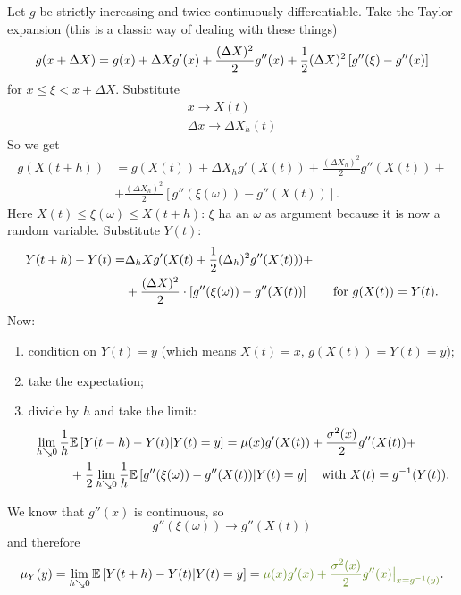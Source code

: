 \documentclass[12pt]{report}
\begin{document}
\begin{fancyproof}
	Let $g$ be strictly increasing and twice continuously differentiable. Take the Taylor expansion (this is a classic way of dealing with these things)
	\begin{equation*}
		g(x+\Delta X)=g(x)+\Delta Xg'(x)+\frac{(\Delta X)^{2}}{2}g''(x)+\frac{1}{2}(\Delta X)^{2}\left[g''(\xi)-g''(x)\right]
	\end{equation*}
	for $x\leq\xi<x+\Delta X$. Substitute 
	\begin{equation*}
		\begin{array}{c}
			x\to X(t)\\
			\Delta  x\to\Delta X_{h}(t)
		\end{array}
	\end{equation*}
	So we get 
	\begin{align*}
		g(X(t+h))&=g(X(t))+\Delta X_{h}g'(X(t))+\frac{(\Delta X_{h})^{2}}{2}g''(X(t))+\\
		&+\frac{(\Delta X_{h})^{2}}{2}\left[g''(\xi(\omega))-g''(X(t))\right].
	\end{align*}
	Here $X(t)\leq\xi(\omega)\leq X(t+h)$: $\xi$ ha an $\omega$ as argument because it is now a random variable. Substitute $Y(t)$:
	\begin{align*}
		Y(t+h)-Y(t)=&\Delta_{h} X g'(X(t)+\frac{1}{2}(\Delta_{h})^{2}g''(X(t)))+\\&+\frac{(\Delta X)^{2}}{2}\cdot\left[g''(\xi(\omega))-g''(X(t))\right]\qquad\text{for }g(X(t))=Y(t).
	\end{align*}
	Now:
	\begin{enumerate}
		\item condition on $Y(t)=y$ (which means $X(t)=x$, $g(X(t))=Y(t)=y$);
		\item take the expectation;
		\item divide by $h$ and take the limit:
		\begin{align*}
			\lim_{h\searrow0}\frac{1}{h}&\mathbb{E}\left[Y(t-h)-Y(t)|Y(t)=y\right]=\mu(x)g'(X(t))+\frac{\sigma^{2}(x)}{2}g''(X(t))+\\
			&+\frac{1}{2}\lim_{h\searrow0}\frac{1}{h}\mathbb{E}\left[g''(\xi(\omega))-g''(X(t))|Y(t)=y\right]\quad\text{with }X(t)=g^{-1}(Y(t)).
		\end{align*}
	\end{enumerate}
	We know that $g''(x)$ is continuous, so 
	\begin{equation*}
		g''(\xi(\omega))\to g''(X(t))
	\end{equation*}
	and therefore
	\begin{equation*}
		\mu_{Y}(y)=\lim_{h\searrow0}\ev{Y(t+h)-Y(t)|Y(t)=y}=\mathcolor{OliveDrab4}{\mu(x)g'(x)+\frac{\sigma^{2}(x)}{2}g''(x)\big|_{x=g^{-1}(y)}}.

\end{equation*}
\end{fancyproof}
\end{document}
